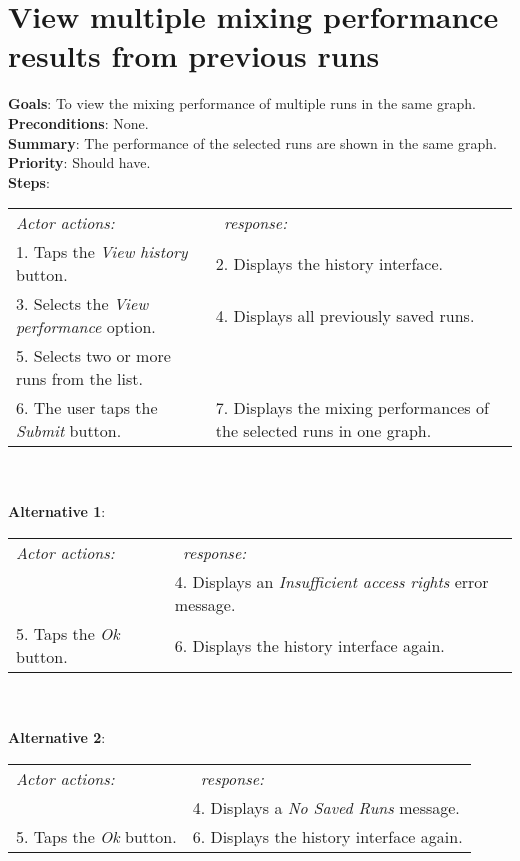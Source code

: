     \section{View multiple mixing performance results from previous runs}
  \label{viewmulruns}
  \textbf{Goals}: To view the mixing performance of multiple runs in the same graph.\\
  \textbf{Preconditions}: None.\\ %
  \textbf{Summary}: The performance of the selected runs are shown in the same graph.\\
  \textbf{Priority}: Should have.\\
  \textbf{Steps}: \\
  \begin{tabular}{ p{} p{} }
  	\emph{Actor actions:} & \emph{\projectname\ response:} \\
	1. Taps the \emph{View history} button. & 2. Displays the history interface. \\
	3. Selects the \emph{View performance} option. & 4. Displays all previously saved runs.\\
	 5. Selects two or more runs from the list. & \\
	 6. The user taps the \emph{Submit} button. & 7. Displays the mixing performances of the selected runs in one graph.\\
  \end{tabular}
  \\
     \\\textbf{Alternative 1}: \\
    \begin{tabular}{ p{} p{} }
  	\emph{Actor actions:} & \emph{\projectname\ response:} \\
            & 4. Displays an \emph{Insufficient access rights} error message. \\
    5. Taps the \emph{Ok} button. & 6. Displays the history interface again. \\
    \end{tabular}
            \\
     \\\textbf{Alternative 2}: \\
    \begin{tabular}{ p{} p{} }
  	\emph{Actor actions:} & \emph{\projectname\ response:} \\
            & 4. Displays a \emph{No Saved Runs} message. \\
    5. Taps the \emph{Ok} button. & 6. Displays the history interface again. \\
    \end{tabular}
    
